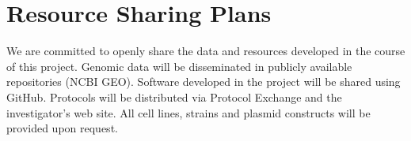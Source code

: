 \section*{Resource Sharing Plans}
We are committed to openly share the data and resources developed in the course of this project.  Genomic data will be disseminated in publicly available repositories (\eg NCBI GEO).  Software developed in the project will be shared using GitHub.  Protocols will be distributed via Protocol Exchange and the investigator's web site.  All cell lines, strains and plasmid constructs will be provided upon request.
